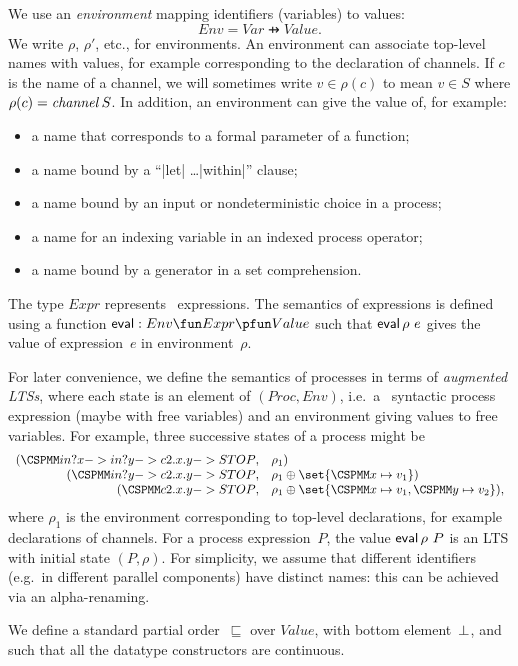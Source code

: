 We use an \emph{environment} mapping identifiers (variables) to values:
\[
Env = Var \pfun Value.
\]
We write $\rho$, $\rho'$, etc., for environments.  An environment can
associate top-level names with values, for example corresponding to the
declaration of channels.  If $c$ is the name of a channel, we will sometimes
write $v \in \rho(c)$ to mean $v \in S$ where $\rho(c) = \mathop{\it channel} S$.
In addition, an environment can give the value of, for example:
%
\begin{itemize}
\item a name that corresponds to a formal parameter of a function;
\item a name bound by a ``|let| \ldots |within|'' clause;
\item a name bound by an input or nondeterministic choice in a process;
\item a name for an indexing variable in an indexed process operator;
\item a name bound by a generator in a set comprehension.
\end{itemize}


The type $Expr$ represents \CSPm\ expressions.  The semantics of expressions is
defined using a function $\eval : Env \fun Expr \pfun Value$ such that
$\mathop{\sf eval} \rho~e$ gives the value of expression~$e$ in environment~$\rho$.

For later convenience, we define the semantics of processes in terms of
\emph{augmented LTSs}, where each state is an element of $(Proc, Env)$,
i.e.~a \CSPm\ syntactic process expression (maybe with free variables) and
an environment giving values to free variables.  For example, three successive
states of a process might be
\[
\begin{array}{rl}
(\M{in?x -> in?y -> c2.x.y -> STOP}, & \rho_1) \\
(\M{in?y -> c2.x.y -> STOP}, & \rho_1 \oplus \set{\M{x} \mapsto v_1}) \\
(\M{c2.x.y -> STOP}, & \rho_1 \oplus \set{\M x \mapsto v_1, \M y \mapsto v_2}),
\end{array}
\]
where $\rho_1$ is the environment corresponding to top-level declarations, for
example declarations of channels.  For a process expression~$P$, the value
$\mathop{\sf eval} \rho~P$ is an LTS with initial state $(P,\rho)$.  For simplicity, we
assume that different identifiers (e.g.~in different parallel components) have
distinct names: this can be achieved via an alpha-renaming.

We define a standard partial order~$\sqsubseteq$ over $Value$, with bottom
element~$\perp$, and such that all the datatype constructors are continuous.

